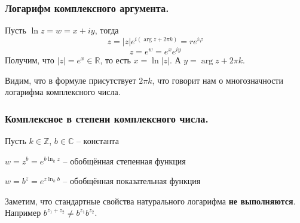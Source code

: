 \subsubsection{Логарифм комплексного аргумента.}

Пусть $\ln{z}=w=x+iy$, тогда
$$z=|z|e^{i(\arg{z}+2\pi k)}=re^{i\varphi}$$
$$z=e^{w}=e^x e^{iy}$$
Получим, что $|z|=e^x\in\mathbb{R}$, то есть $x=\ln{|z|}$. А $y=\arg{z}+2\pi k$.

Видим, что в формуле присутствует $2\pi k$, что говорит нам о многозначности логарифма комплексного числа.

\subsubsection{Комплексное в степени комплексного числа.}

Пусть $k\in\mathbb{Z}$, $b\in\mathbb{C}$ -- константа

$w=z^b=e^{b\ln_k{z}}$ -- обобщённая степенная функция

$w=b^z=e^{z\ln_k{b}}$ -- обобщённая показательная функция

Заметим, что стандартные свойства натурального логарифма \textbf{не выполняются}. Например $b^{z_1 + z_2} \neq b^{z_1} b^{z_2}$.

